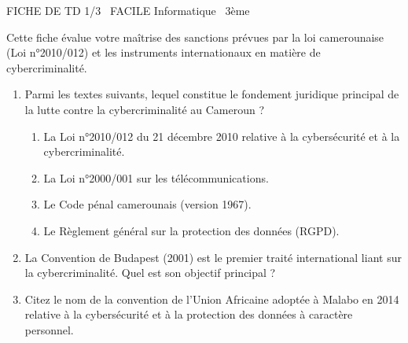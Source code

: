 \documentclass[11pt]{article}
\begin{document}
\begin{tcolorbox}[enhanced,colback=popink,colframe=popink,arc=10pt,boxrule=0pt,left=12pt,right=12pt,top=9pt,bottom=9pt]
{\color{white}\popxbold\small FICHE DE TD 1/3 \textbullet\ FACILE \hfill Informatique \textbullet\ 3ème\par}
\end{tcolorbox}
\vspace{4pt}
Cette fiche évalue votre maîtrise des sanctions prévues par la loi camerounaise (Loi n°2010/012) et les instruments internationaux en matière de cybercriminalité.

\begin{exercice}
\begin{enumerate}
    \item Parmi les textes suivants, lequel constitue le fondement juridique principal de la lutte contre la cybercriminalité au Cameroun ?
    \begin{enumerate}
        \item La Loi n°2010/012 du 21 décembre 2010 relative à la cybersécurité et à la cybercriminalité.
        \item La Loi n°2000/001 sur les télécommunications.
        \item Le Code pénal camerounais (version 1967).
        \item Le Règlement général sur la protection des données (RGPD).
    \end{enumerate}
    \item La Convention de Budapest (2001) est le premier traité international liant sur la cybercriminalité. Quel est son objectif principal ?
    \item Citez le nom de la convention de l'Union Africaine adoptée à Malabo en 2014 relative à la cybersécurité et à la protection des données à caractère personnel.
\end{enumerate}
\end{exercice}
\end{document}
